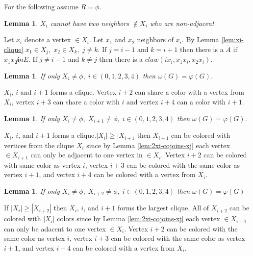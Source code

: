\documentclass[12pt]{article}
\newtheorem{Lemma}[Theorem]{Lemma}
\begin{document}
For the following assume $R = \phi$. 

\begin{Lemma}\label{lem:xi-neighbor-adjacent}
$X_i$ cannot have two neighbors $\not \in X_i$ who are non-adjacent
\end{Lemma}
 Let $x_i$ denote a vertex $\in X_i$. Let $x_1$ and $x_2$ neighbors of $x_i$. By Lemma \ref{lem:xi-clique} $x_1 \in X_j,\; x_2 \in X_k,\; j \neq k$. If $j=i-1$ and $k=i+1$ then there is a $\overline{A}$ if $x_1x_2 \not in E$. If $j \neq i-1$ and $k \neq j$ then there is a $claw (ix_i, x_1x_i,x_2x_i)$.

\begin{Lemma}\label{lem:one-clique}
If only $X_i \neq \phi,\; i \in ({0, 1, 2, 3, 4})$ then $\omega(G) = \varphi(G)$.
\end{Lemma}
 $X_i$, $i$ and $i+1$ forms a clique. Vertex $i+2$ can share a color with a vertex from $X_i$, vertex $i+3$ can share a color with $i$ and vertex $i+4$ can a color with $i+1$.

\begin{Lemma}\label{lem:xi-xi2-clique}
If only $X_i \neq \phi,\; X_{i+1} \neq \phi,\; i \in ({0, 1, 2, 3, 4})$ then $\omega(G) = \varphi(G)$.
\end{Lemma}
 $X_i$, $i$, and $i+1$ forms a clique.$|X_i| \geq |X_{i+1}$ then $X_{i+1}$ can be colored with vertices from the clique $X_i$ since by Lemma \ref{lem:2xi-cojoins-xj} each vertex $\in X_{i+1}$ can only be adjacent to one vertex in $\in X_{i}$. Vertex $i+2$ can be colored with same color as vertex $i$, vertex $i+3$ can be colored with the same color as vertex $i+1$, and vertex $i+4$ can be colored with a vertex from $X_i$.

\begin{Lemma}\label{lem:xi-xi3-clique}
If only $X_i \neq \phi,\; X_{i+2} \neq \phi,\; i \in ({0, 1, 2, 3,4})$ then $\omega(G) = \varphi(G)$
\end{Lemma}
 If $|X_i| \geq |X_{i+2}|$ then $X_i$, $i$, and $i+1$ forms the largest clique. All of $X_{i+2}$ can be colored with $|X_i|$ colors since by Lemma \ref{lem:2xi-cojoins-xj} each vertex $\in X_{i+1}$ can only be adacent to one vertex $\in X_{i}$. Vertex $i+2$ can be colored with the same color as vertex $i$, vertex $i+3$ can be colored with the same color as vertex $i+1$, and vertex $i+4$ can be colored with a vertex from $X_i$.
\end{document}
